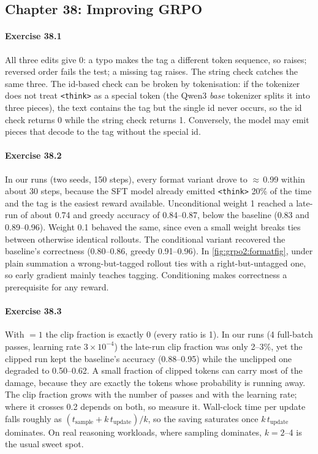 \subsection*{Chapter 38: Improving GRPO}

\paragraph{Exercise 38.1} All three edits give 0: a typo makes the tag a different token
sequence, so  raises; reversed order fails the \code{<} test; a missing tag raises.
The string check catches the same three. The id-based check can be broken by tokenisation:
if the tokenizer does not treat \verb|<think>| as a special token (the Qwen3 \emph{base}
tokenizer splits it into three pieces), the text contains the tag but the single id never
occurs, so the id check returns 0 while the string check returns 1. Conversely, the model may
emit pieces that decode to the tag without the special id.

\paragraph{Exercise 38.2} In our runs (two seeds, 150 steps), every format variant drove
 to $\approx$\,0.99 within about 30 steps, because the SFT model already emitted
\verb|<think>| 20\% of the time and the tag is the easiest reward available. Unconditional
weight 1 reached a late-run  of about 0.74 and greedy accuracy of 0.84--0.87,
below the baseline (0.83 and 0.89--0.96). Weight 0.1 behaved the same, since even a small
weight breaks ties between otherwise identical rollouts. The conditional variant recovered
the baseline's correctness (0.80--0.86, greedy 0.91--0.96). In \cref{fig:grpo2:formatfig},
under plain summation a wrong-but-tagged rollout ties with a right-but-untagged one, so early
gradient mainly teaches tagging. Conditioning makes correctness a prerequisite for any reward.

\paragraph{Exercise 38.3} With $=1$ the clip fraction is exactly 0
(every ratio is 1). In our  runs (4 full-batch passes, learning rate
$3\times10^{-4}$) the late-run clip fraction was only 2--3\%, yet the clipped run kept the
baseline's accuracy (0.88--0.95) while the unclipped one degraded to 0.50--0.62. A small
fraction of clipped tokens can carry most of the damage, because they are exactly the tokens
whose probability is running away. The clip fraction grows with the number of passes and with
the learning rate; where it crosses 0.2 depends on both, so measure it. Wall-clock time per
update falls roughly as $(t_{\text{sample}}+k\,t_{\text{update}})/k$, so the saving saturates
once $k\,t_{\text{update}}$ dominates. On real reasoning workloads, where sampling dominates,
$k=2$--4 is the usual sweet spot.

